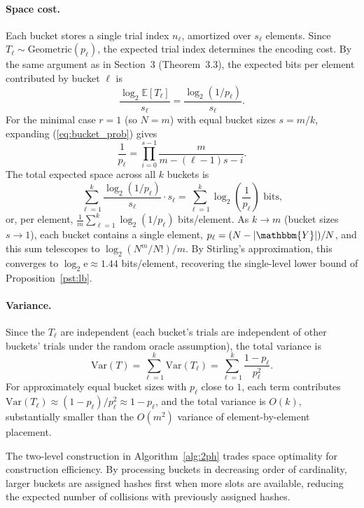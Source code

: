 \documentclass[hidelinks,11pt,final]{article}
\theoremstyle{plain}
\newcommand{\geodist}{\mathrm{Geometric}}
\newcommand{\Expect}[1]{\mathbb{E}\left[#1\right]}
\begin{document}
\paragraph{Space cost.}
Each bucket stores a single trial index $n_\ell$, amortized over $s_\ell$ elements. Since $T_\ell \sim \geodist(p_\ell)$, the expected trial index determines the encoding cost. By the same argument as in Section~3 (Theorem~3.3), the expected bits per element contributed by bucket $\ell$ is
\begin{equation}
\frac{\log_2 \Expect{T_\ell}}{s_\ell} = \frac{\log_2(1/p_\ell)}{s_\ell}.
\end{equation}
For the minimal case $r = 1$ (so $N = m$) with equal bucket sizes $s = m/k$, expanding (\ref{eq:bucket_prob}) gives
\begin{equation}
\frac{1}{p_\ell} = \prod_{i=0}^{s-1} \frac{m}{m - (\ell-1)s - i}.
\end{equation}
The total expected space across all $k$ buckets is
\begin{equation}
\sum_{\ell=1}^{k} \frac{\log_2(1/p_\ell)}{s_\ell} \cdot s_\ell = \sum_{\ell=1}^{k} \log_2\!\left(\frac{1}{p_\ell}\right) \text{ bits},
\end{equation}
or, per element, $\frac{1}{m}\sum_{\ell=1}^{k} \log_2(1/p_\ell)$ bits/element. As $k \to m$ (bucket sizes $s \to 1$), each bucket contains a single element, $p_\ell = (N - |\mathbbm{Y}|)/N$, and this sum telescopes to $\log_2(N^m / N!) / m$. By Stirling's approximation, this converges to $\log_2 \mathrm{e} \approx 1.44$ bits/element, recovering the single-level lower bound of Proposition~\ref{pst:lb}.

\paragraph{Variance.}
Since the $T_\ell$ are independent (each bucket's trials are independent of other buckets' trials under the random oracle assumption), the total variance is
\begin{equation}
\mathrm{Var}(T) = \sum_{\ell=1}^{k} \mathrm{Var}(T_\ell) = \sum_{\ell=1}^{k} \frac{1 - p_\ell}{p_\ell^2}.
\end{equation}
For approximately equal bucket sizes with $p_\ell$ close to $1$, each term contributes $\mathrm{Var}(T_\ell) \approx (1 - p_\ell)/p_\ell^2 \approx 1 - p_\ell$, and the total variance is $O(k)$, substantially smaller than the $O(m^2)$ variance of element-by-element placement.

The two-level construction in Algorithm~\ref{alg:2ph} trades space optimality for construction efficiency. By processing buckets in decreasing order of cardinality, larger buckets are assigned hashes first when more slots are available, reducing the expected number of collisions with previously assigned hashes.
\end{document}
